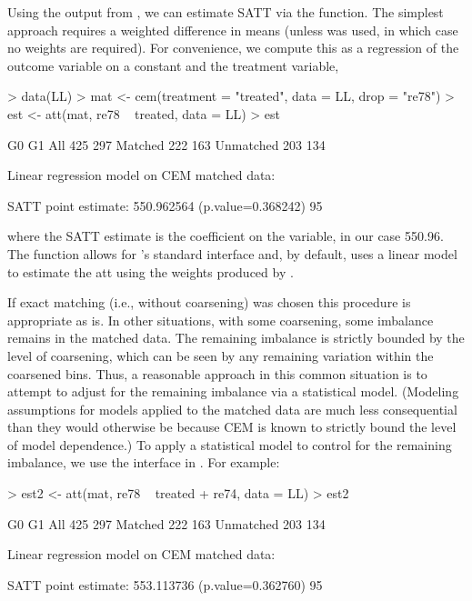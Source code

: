 \documentclass[article]{jss}
\begin{document}
Using the output from , we can estimate SATT via the
 function.  The simplest approach requires a weighted
difference in means (unless  was used, in which case no
weights are required).  For convenience, we compute this as a
regression of the outcome variable on a constant and the treatment variable,
\begin{Schunk}
\begin{Sinput}
> data(LL)
> mat <- cem(treatment = "treated", data = LL, drop = "re78")
> est <- att(mat, re78 ~ treated, data = LL)
> est
\end{Sinput}
\begin{Soutput}
           G0  G1
All       425 297
Matched   222 163
Unmatched 203 134

Linear regression model on CEM matched data:

SATT point estimate: 550.962564 (p.value=0.368242)
95%
\end{Soutput}
\end{Schunk}
where the SATT estimate is the coefficient on the 
variable, in our case 550.96.  The function
 allows for 's standard  interface and, by
default, uses a linear model to estimate the att using the weights 
produced by .  

If exact matching (i.e., without coarsening) was chosen this procedure
is appropriate as is.  In other situations, with some coarsening, some
imbalance remains in the matched data.  The remaining imbalance is
strictly bounded by the level of coarsening, which can be seen by any
remaining variation within the coarsened bins.  Thus, a reasonable
approach in this common situation is to attempt to adjust for the
remaining imbalance via a statistical model.  (Modeling assumptions
for models applied to the matched data are much less consequential
than they would otherwise be because CEM is known to strictly bound
the level of model dependence.)  To apply a statistical model to
control for the remaining imbalance, we use the 
interface in .  For example:

\begin{Schunk}
\begin{Sinput}
> est2 <- att(mat, re78 ~ treated + re74, data = LL)
> est2
\end{Sinput}
\begin{Soutput}
           G0  G1
All       425 297
Matched   222 163
Unmatched 203 134

Linear regression model on CEM matched data:

SATT point estimate: 553.113736 (p.value=0.362760)
95%
\end{Soutput}
\end{Schunk}
\end{document}
